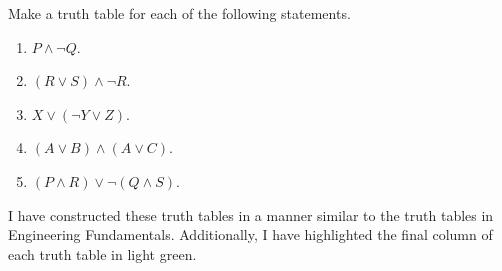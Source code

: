 \documentclass[11pt]{article}
\begin{document}
\begin{homeworkProblem}

Make a truth table for each of the following statements.

\begin{enumerate}[label=(\alph*), topsep=5pt, itemsep=2pt]
    \item $P \land \lnot Q$.
    \item $(R \lor S) \land \lnot R$.
    \item $X \lor (\lnot Y \lor Z)$.
    \item $(A \lor B) \land (A \lor C)$.
    \item $(P \land R) \lor \lnot (Q \land S)$.
\end{enumerate} \vspace{1\baselineskip}

\solution

I have constructed these truth tables in a manner similar to the truth tables in Engineering Fundamentals.
Additionally, I have highlighted the final column of each truth table in light green. \vspace{1\baselineskip}


\end{homeworkProblem}
\end{document}
